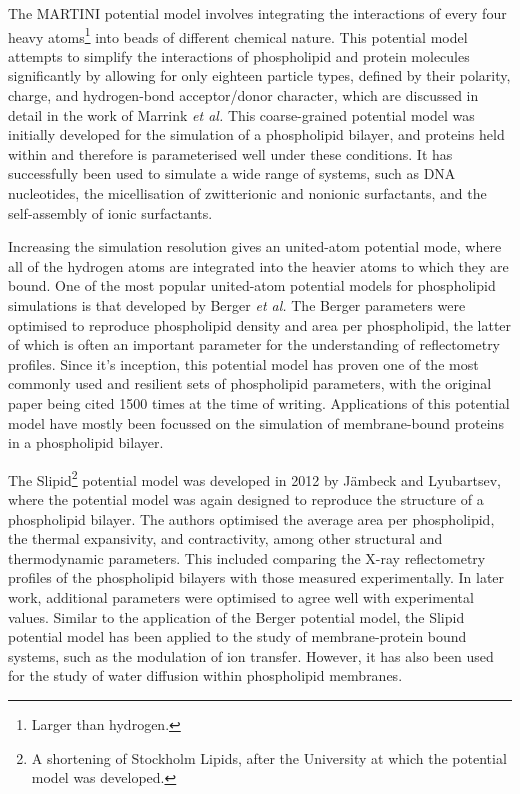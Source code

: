 The MARTINI potential model involves integrating the interactions of every four heavy atoms\footnote{Larger than hydrogen.} into beads of different chemical nature.
This potential model attempts to simplify the interactions of phospholipid and protein molecules significantly by allowing for only eighteen particle types, defined by their polarity, charge, and hydrogen-bond acceptor/donor character, which are discussed in detail in the work of Marrink \emph{et al.}\autocite{marrink_martini_2007}
This coarse-grained potential model was initially developed for the simulation of a phospholipid bilayer, and proteins held within and therefore is parameterised well under these conditions.
It has successfully been used to simulate a wide range of systems, such as DNA nucleotides,\autocite{uusitalo_martini_2015} the micellisation of zwitterionic and nonionic surfactants,\autocite{sanders_micellization_2010} and the self-assembly of ionic surfactants.\autocite{wang_coarse-grained_2015}

Increasing the simulation resolution gives an united-atom potential mode, where all of the hydrogen atoms are integrated into the heavier atoms to which they are bound.
One of the most popular united-atom potential models for phospholipid simulations is that developed by Berger \emph{et al.}\autocite{berger_molecular_1997}
The Berger parameters were optimised to reproduce phospholipid density and area per phospholipid, the latter of which is often an important parameter for the understanding of reflectometry profiles.
Since it's inception, this potential model has proven one of the most commonly used and resilient sets of phospholipid parameters, with the original paper being cited 1500 times at the time of writing.
Applications of this potential model have mostly been focussed on the simulation of membrane-bound proteins in a phospholipid bilayer.\autocite{tieleman_membrane_2006,cordomi_membrane_2012}

The Slipid\footnote{A shortening of Stockholm Lipids, after the University at which the potential model was developed.} potential model was developed in 2012 by J\"{a}mbeck and Lyubartsev,\autocite{jambeck_derivation_2012} where the potential model was again designed to reproduce the structure of a phospholipid bilayer.
The authors optimised the average area per phospholipid, the thermal expansivity, and contractivity, among other structural and thermodynamic parameters.
This included comparing the X-ray reflectometry profiles of the phospholipid bilayers with those measured experimentally.
In later work, additional parameters were optimised to agree well with experimental values.\autocite{jambeck_extension_2012,jambeck_another_2013}
Similar to the application of the Berger potential model, the Slipid potential model has been applied to the study of membrane-protein bound systems, such as the modulation of ion transfer.\autocite{segala_controlling_2016}
However, it has also been used for the study of water diffusion within phospholipid membranes.\autocite{von_hansen_anomalous_2013}

